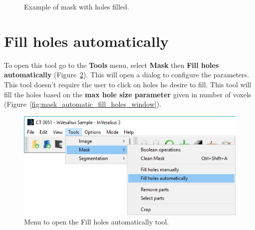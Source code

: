 \begin{figure}[!htb]
  \centering
    \qquad
  \hfill
  \caption{Example of mask with holes filled.}
  \label{fig:mask_fill_hole}
\end{figure}


\section{Fill holes automatically}

To open this tool go to the \textbf{Tools} menu, select \textbf{Mask} then \textbf{Fill holes automatically} (Figure~\ref{fig:menu_mask_automatic_fill_holes}). This will open a dialog to configure the parameters. This tool doesn’t require the user to click on holes he desire to fill. This tool will fill the holes based on the \textbf{max hole size parameter} given in number of voxels (Figure~\ref{fig:mask_automatic_fill_holes_window}).

\begin{figure}[!htb]
\centering
\includegraphics[scale=0.4]{../user_guide_figures/invesalius_screen/menu_mask_automatic_fill_holes_en.png}
\caption{Menu to open the Fill holes automatically tool.}
\label{fig:menu_mask_automatic_fill_holes}
\end{figure}

